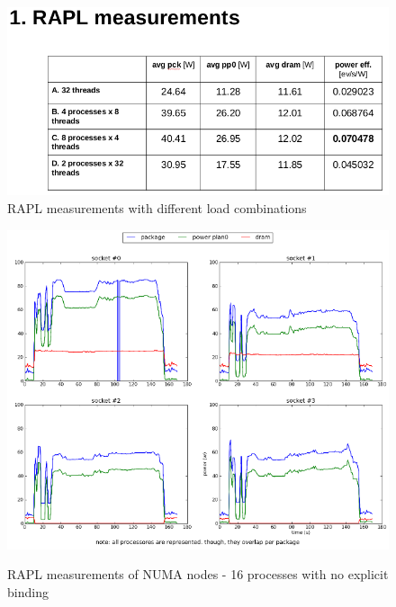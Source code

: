 \begin{figure}[h!]
  \centering
    \includegraphics[width=150mm]{"img/cern/rapl"}
    \caption{RAPL measurements with different load combinations }
    \label{fig:nf_ss}
\end{figure}


\begin{figure}[h!]
  \centering
    \includegraphics[width=150mm]{"img/numa/16proc_no_binding"}
    \label{fig:nf_ss}
    \caption{RAPL measurements of NUMA nodes - 16 processes with no explicit
binding}
\end{figure}


